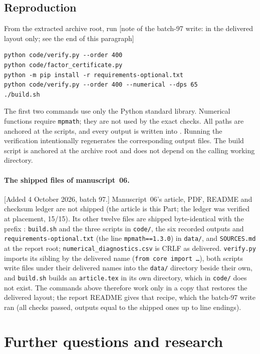 \documentclass[11pt]{article}
\numberwithin{equation}{section}
\theoremstyle{definition}
\theoremstyle{remark}
\theoremstyle{definition}
\begin{document}
\subsection{Reproduction}

From the extracted archive root, run [note of the batch-97 write: in the
delivered layout only; see the end of this paragraph]
\begin{verbatim}
python code/verify.py --order 400
python code/factor_certificate.py
python -m pip install -r requirements-optional.txt
python code/verify.py --order 400 --numerical --dps 65
./build.sh
\end{verbatim}
The first two commands use only the Python standard library. Numerical
functions require \texttt{mpmath}; they are not used by the exact checks.
All paths are anchored at the scripts, and every output is written into
. Running the verification intentionally regenerates the
corresponding output files. The build script is anchored at the archive root
and does not depend on the calling working directory.

\paragraph{The shipped files of manuscript~06.} [Added 4 October 2026,
batch 97.] Manuscript~06's article, PDF, README and checksum ledger are not
shipped (the article is this Part; the ledger was verified at placement,
15/15). Its other twelve files are shipped byte-identical with the prefix
: \texttt{build.sh} and the three scripts in
\texttt{code/}, the six recorded outputs and \texttt{requirements-optional.txt}
(the line \texttt{mpmath==1.3.0}) in \texttt{data/}, and \texttt{SOURCES.md}
at the report root; \texttt{numerical\_diagnostics.csv} is CRLF as delivered.
\texttt{verify.py} imports its sibling by the delivered name
(\texttt{from core import \ldots}), both scripts write files under their
delivered names into the \texttt{data/} directory beside their own, and
\texttt{build.sh} builds an \texttt{article.tex} in its own directory, which
in \texttt{code/} does not exist. The commands above therefore work only in a
copy that restores the delivered layout; the report README gives that
recipe, which the batch-97 write ran (all checks passed, outputs equal to the
shipped ones up to line endings).

\section{Further questions and research}
\label{spf:bc:sec:questions}
\end{document}
